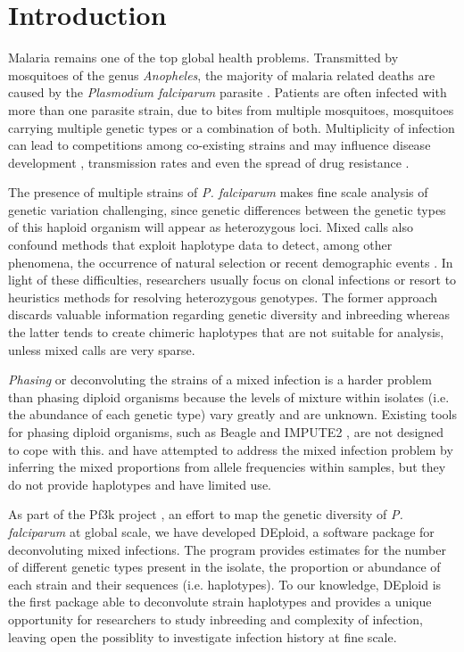 \documentclass{bioinfo}
\begin{document}
\maketitle

\section{Introduction}
Malaria remains one of the top global health problems. Transmitted by mosquitoes of the genus {\it Anopheles}, the majority of malaria related deaths are caused by the {\it Plasmodium falciparum} parasite \citep{WHO2016}. Patients are often infected with  more than one parasite strain, due to bites from multiple mosquitoes, mosquitoes carrying multiple genetic types or a combination of both. Multiplicity of infection  can lead to competitions among co-existing strains and may influence disease development \citep{deRoode2005}, transmission rates \citep{Arnot1998} and even the spread of drug resistance \citep{deRoode2004}.

The presence of multiple strains of {\it P. falciparum} makes fine scale analysis of genetic variation challenging, since genetic differences between the genetic types of this haploid organism will appear as heterozygous loci. Mixed calls also confound methods that exploit haplotype data to detect, among other phenomena, the occurrence of natural selection or recent demographic events . In light of these difficulties, researchers usually focus on clonal infections or resort to heuristics methods for resolving heterozygous genotypes. The former approach discards valuable information regarding genetic diversity and inbreeding whereas the latter tends to create chimeric haplotypes that are not suitable for analysis, unless mixed calls are very sparse.

{\it Phasing} or deconvoluting the strains of a mixed infection is a harder problem than phasing diploid organisms because the levels of mixture within isolates (i.e. the abundance of each genetic type) vary greatly and are unknown.  Existing tools for phasing diploid organisms, such as Beagle \citep{Browning2007} and IMPUTE2 \citep{Howie2009}, are not designed to cope with this. \citet{Galinsky2015} and \citet{Jack2016} have attempted to address the mixed infection problem by inferring the mixed proportions from allele frequencies within samples, but they do not provide haplotypes and have limited use.

As part of the Pf3k project \citep{Pf3k2016}, an effort to map the genetic diversity of {\it P. falciparum} at global scale, we have developed {\textmd DEploid}, a software package for deconvoluting mixed infections. The program provides estimates for the number of different genetic types present in the isolate, the proportion or abundance of each strain and their sequences (i.e. haplotypes). To our knowledge, DEploid is the first package able to deconvolute strain haplotypes and provides a unique opportunity for researchers to study inbreeding and complexity of infection, leaving open the possiblity to investigate infection history at fine scale.
\end{document}
